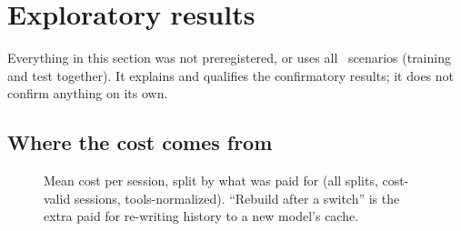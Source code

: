 \section{Exploratory results \texorpdfstring{\screen}{[screen]}}\label{sec:explore}

Everything in this section was not preregistered, or uses all \NScenarios\ scenarios (training and test
together). It explains and qualifies the confirmatory results; it does not confirm anything on its own.

\subsection{Where the cost comes from}\label{sec:composition}

\begin{figure}[htbp]
\centering
{}\par\smallskip

\caption{Mean cost per session, split by what was paid for (all splits, cost-valid sessions,
tools-normalized). ``Rebuild after a switch'' is the extra paid for re-writing history to a new model's
cache.}
\label{fig:composition}
\end{figure}

\begin{table}[htbp]
\centering\small
\caption{The numbers behind \cref{fig:composition}: dollars per session by token class, main-loop requests per
session, and cache-read tokens per session (millions).}
\label{tab:composition}

\end{table}

